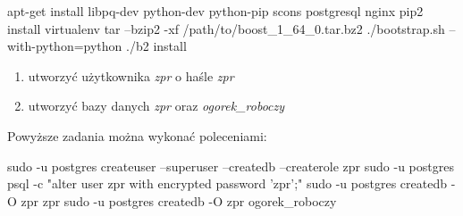 \begin{spverbatim}
	apt-get install libpq-dev python-dev python-pip scons postgresql nginx
	pip2 install virtualenv
	tar --bzip2 -xf /path/to/boost_1_64_0.tar.bz2 ./bootstrap.sh --with-python=python ./b2 install
\end{spverbatim}

\begin{enumerate}[resume]
	\item utworzyć użytkownika \textit{zpr} o haśle \textit{zpr}
	\item utworzyć bazy danych \textit{zpr} oraz \textit{ogorek\_roboczy}
\end{enumerate}
Powyższe zadania można wykonać poleceniami:

\begin{spverbatim}
	sudo -u postgres createuser --superuser --createdb --createrole zpr 
	sudo -u postgres psql -c "alter user zpr with encrypted password 'zpr';"
	sudo -u postgres createdb -O zpr zpr 
	sudo -u postgres createdb -O zpr ogorek_roboczy
\end{spverbatim}

